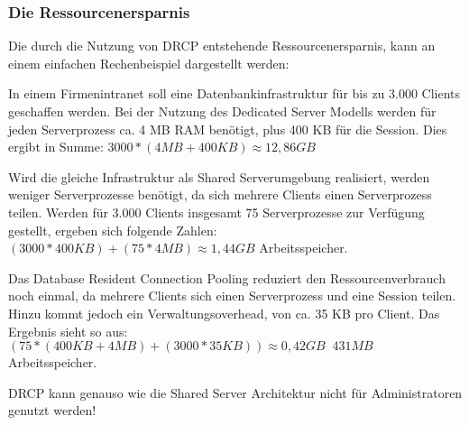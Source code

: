        \subsubsection{Die Ressourcenersparnis}
          Die durch die Nutzung von DRCP entstehende Ressourcenersparnis, kann an einem einfachen Rechenbeispiel dargestellt werden:

          In einem Firmenintranet soll eine Datenbankinfrastruktur für bis zu 3.000 Clients geschaffen werden. Bei der Nutzung des Dedicated Server Modells werden für jeden Serverprozess ca. 4 MB RAM benötigt, plus 400 KB für die Session. Dies ergibt in Summe: $3000 * (4MB + 400KB) \approx 12,86 GB$

          Wird die gleiche Infrastruktur als Shared Serverumgebung realisiert, werden weniger Serverprozesse benötigt, da sich mehrere Clients einen Serverprozess teilen. Werden für 3.000 Clients insgesamt 75 Serverprozesse zur Verfügung gestellt, ergeben sich folgende Zahlen: $(3000 * 400 KB) + (75 * 4 MB) \approx 1,44 GB$ Arbeitsspeicher.

          Das Database Resident Connection Pooling reduziert den Ressourcenverbrauch noch einmal, da mehrere Clients sich einen Serverprozess und eine Session teilen. Hinzu kommt jedoch ein Verwaltungsoverhead, von ca. 35 KB pro Client. Das Ergebnis sieht so aus: $(75 * (400 KB + 4 MB) + (3000 * 35 KB)) \approx 0,42 GB \mathop{\widehat{=}} 431 MB$ Arbeitsspeicher.

          \begin{merke}
            DRCP kann genauso wie die Shared Server Architektur nicht für Administratoren genutzt werden!
          \end{merke}
\clearpage
